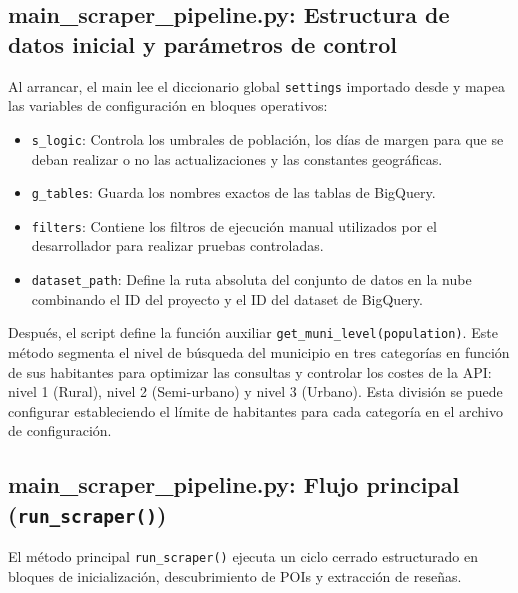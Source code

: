 \subsection{main\_scraper\_pipeline.py: Estructura de datos inicial y parámetros de control}
Al arrancar, el main lee el diccionario global \texttt{settings} importado desde  y mapea las variables de configuración en bloques operativos:
\begin{itemize}
    \item \texttt{s\_logic}: Controla los umbrales de población, los días de margen para que se deban realizar o no las actualizaciones y las constantes geográficas.
    \item \texttt{g\_tables}: Guarda los nombres exactos de las tablas de BigQuery.
    \item \texttt{filters}: Contiene los filtros de ejecución manual utilizados por el desarrollador para realizar pruebas controladas.
    \item \texttt{dataset\_path}: Define la ruta absoluta del conjunto de datos en la nube combinando el ID del proyecto y el ID del dataset de BigQuery.
\end{itemize}

Después, el script define la función auxiliar \texttt{get\_muni\_level(population)}. Este método segmenta el nivel de búsqueda del municipio en tres categorías en función de sus habitantes para optimizar las consultas y controlar los costes de la API: nivel 1 (Rural), nivel 2 (Semi-urbano) y nivel 3 (Urbano). Esta división se puede configurar estableciendo el límite de habitantes para cada categoría en el archivo de configuración.

\subsection{main\_scraper\_pipeline.py: Flujo principal (\texttt{run\_scraper()})}
El método principal \texttt{run\_scraper()} ejecuta un ciclo cerrado estructurado en bloques de inicialización, descubrimiento de POIs y extracción de reseñas.


